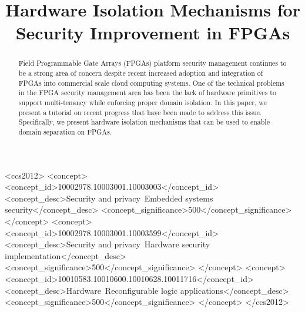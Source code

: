 \documentclass[sigconf]{acmart}
\theoremstyle{plain}
\theoremstyle{remark}
\begin{document}
\title{Hardware Isolation Mechanisms for Security Improvement in FPGAs}
%
%  
%   
%  


\begin{abstract}
Field Programmable Gate Arrays (FPGAs) platform security management continues to be a strong area of concern despite recent increased adoption and integration of FPGAs into commercial scale cloud computing systems. One of the technical problems in the FPGA security management area has been the lack of hardware primitives to support multi-tenancy while enforcing proper domain isolation. In this paper, we present a tutorial on recent progress that have been made to address this issue. Specifically, we present hardware isolation mechanisms that can be used to enable domain separation on FPGAs.
\end{abstract}


\begin{CCSXML}
<ccs2012>
<concept>
<concept_id>10002978.10003001.10003003</concept_id>
<concept_desc>Security and privacy~Embedded systems security</concept_desc>
<concept_significance>500</concept_significance>
</concept>
<concept>
<concept_id>10002978.10003001.10003599</concept_id>
<concept_desc>Security and privacy~Hardware security implementation</concept_desc>
<concept_significance>500</concept_significance>
</concept>
<concept>
<concept_id>10010583.10010600.10010628.10011716</concept_id>
<concept_desc>Hardware~Reconfigurable logic applications</concept_desc>
<concept_significance>500</concept_significance>
</concept>
</ccs2012>
\end{CCSXML}

\end{document}
